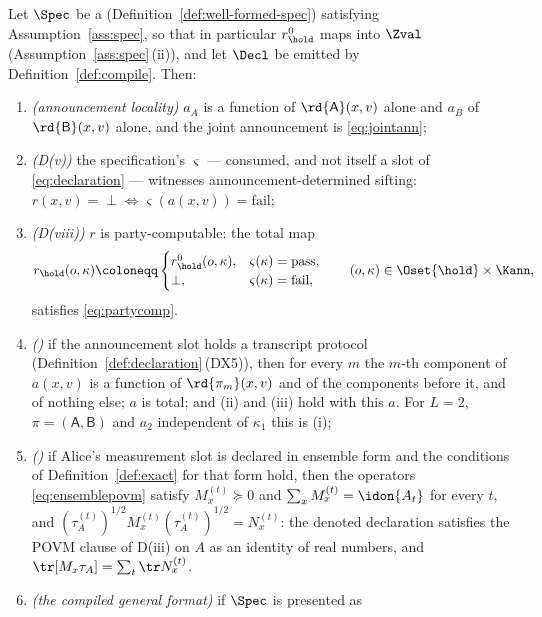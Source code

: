 \begin{theorem}\label{thm:sifting-and-key}
Let $\Spec$ be a 
(Definition~\ref{def:well-formed-spec}) satisfying
Assumption~\ref{ass:spec}, so
that in particular $r^{0}_{\hold}$ maps into $\Zval$
(Assumption~\ref{ass:spec}\,(ii)), and let $\Decl$ be emitted by
Definition~\ref{def:compile}. Then:
\begin{enumerate}[label=(\roman*),leftmargin=2.2em]
\item \emph{(announcement locality)} $a_A$ is a function of
$\rd{\mathsf A}(x,v)$ alone and $a_B$ of $\rd{\mathsf B}(x,v)$ alone, and the
joint announcement is \eqref{eq:jointann};
\item \emph{(D(v))} the specification's $\varsigma$ --- consumed, and not
itself a slot of \eqref{eq:declaration} --- witnesses announcement-determined
sifting: $r(x,v)=\perp\iff\varsigma(a(x,v))=\mathrm{fail}$;
\item \emph{(D(viii))} $r$ is party-computable: the total map
\begin{equation}\label{eq:rhold}
  r_{\hold}(o,\kappa)\coloneqq
  \begin{cases}
    r^{0}_{\hold}(o,\kappa), & \varsigma(\kappa)=\mathrm{pass},\\
    \perp, & \varsigma(\kappa)=\mathrm{fail},
  \end{cases}
  \qquad (o,\kappa)\in\Oset{\hold}\times\Kann,
\end{equation}
satisfies \eqref{eq:partycomp}.
\item \emph{()} if the
announcement slot holds a transcript protocol
(Definition~\ref{def:declaration}\,(DX5)), then for
every $m$ the $m$-th component of $a(x,v)$ is a function of
$\rd{\pi_m}(x,v)$ and of the components before it, and of nothing else; $a$ is
total; and (ii) and (iii) hold with this $a$. For $L=2$,
$\pi=(\mathsf A,\mathsf B)$ and $a_2$ independent of $\kappa_1$ this is (i);
\item \emph{()} if Alice's measurement slot is declared
in ensemble form and the conditions of Definition~\ref{def:exact} for that
form hold, then the operators \eqref{eq:ensemblepovm} satisfy
$M^{(t)}_x\succeq0$ and $\sum_xM^{(t)}_x=\idon{A_t}$ for every $t$, and
$(\tau^{(t)}_A)^{1/2}M^{(t)}_x(\tau^{(t)}_A)^{1/2}=N^{(t)}_x$: the denoted
declaration satisfies the POVM clause of D(iii) on $A$ as an identity of real
numbers, and $\tr[M_x\tau_A]=\sum_t\tr N^{(t)}_x$.
\item \emph{(the compiled general format)} if $\Spec$ is presented as

\end{enumerate}
\end{theorem}

